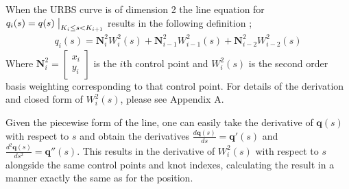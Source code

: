 When the URBS curve is of dimension 2 the line equation for $q_i(s) = q(s)\bigm|_{K_i \leq s < K_{i+1}}$ results in the following definition \cite{website:nurbsExplain};
\begin{align*}
q_i(s) = \textbf{N}_i^2W_{i}^{2}(s) + \textbf{N}_{i-1}^2W_{i-1}^{2}(s) + \textbf{N}_{i-2}^2W_{i-2}^{2}(s)
\end{align*}
Where $\textbf{N}_i^2 = \begin{bmatrix}
x_i\\y_i
\end{bmatrix}$ is the $i$th control point and $W_{i}^{2}(s)$ is the second order basis weighting corresponding to that control point. 
For details of the derivation and closed form of $W_{i}^{2}(s)$, please see Appendix A.

Given the piecewise form of the line, one can easily take the derivative of $\textbf{q}(s)$ with respect to $s$ and obtain the derivatives $\frac{d\textbf{q}(s)}{ds} = \textbf{q}'(s)$ and $\frac{d^2\textbf{q}(s)}{ds^2} = \textbf{q}''(s)$. This results in the derivative of $W_{i}^{2}(s)$ with respect to $s$ alongside the same control points and knot indexes, calculating the result in a manner exactly the same as for the position.